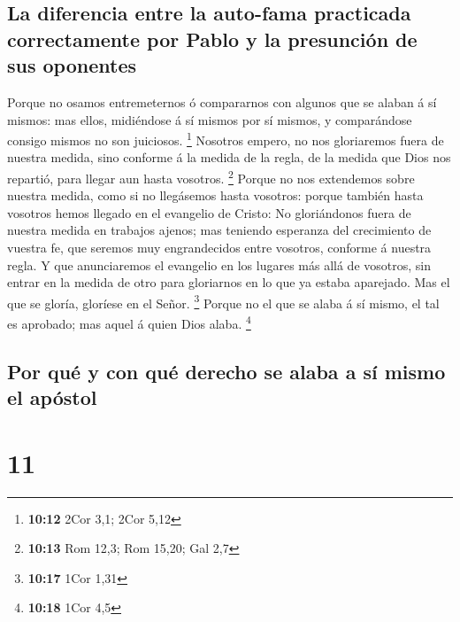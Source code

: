 \hypertarget{la-diferencia-entre-la-auto-fama-practicada-correctamente-por-pablo-y-la-presunciuxf3n-de-sus-oponentes}{%
\subsection{La diferencia entre la auto-fama practicada correctamente
por Pablo y la presunción de sus
oponentes}\label{la-diferencia-entre-la-auto-fama-practicada-correctamente-por-pablo-y-la-presunciuxf3n-de-sus-oponentes}}

 Porque no osamos entremeternos ó compararnos con algunos
que se alaban á sí mismos: mas ellos, midiéndose á sí mismos por sí
mismos, y comparándose consigo mismos no son juiciosos. \footnote{\textbf{10:12}
  2Cor 3,1; 2Cor 5,12}  Nosotros empero, no nos gloriaremos
fuera de nuestra medida, sino conforme á la medida de la regla, de la
medida que Dios nos repartió, para llegar aun hasta vosotros.
\footnote{\textbf{10:13} Rom 12,3; Rom 15,20; Gal 2,7} 
Porque no nos extendemos sobre nuestra medida, como si no llegásemos
hasta vosotros: porque también hasta vosotros hemos llegado en el
evangelio de Cristo:  No gloriándonos fuera de nuestra
medida en trabajos ajenos; mas teniendo esperanza del crecimiento de
vuestra fe, que seremos muy engrandecidos entre vosotros, conforme á
nuestra regla.  Y que anunciaremos el evangelio en los
lugares más allá de vosotros, sin entrar en la medida de otro para
gloriarnos en lo que ya estaba aparejado.  Mas el que se
gloría, gloríese en el Señor. \footnote{\textbf{10:17} 1Cor 1,31}
 Porque no el que se alaba á sí mismo, el tal es aprobado;
mas aquel á quien Dios alaba. \footnote{\textbf{10:18} 1Cor 4,5}

\hypertarget{por-quuxe9-y-con-quuxe9-derecho-se-alaba-a-suxed-mismo-el-apuxf3stol}{%
\subsection{Por qué y con qué derecho se alaba a sí mismo el
apóstol}\label{por-quuxe9-y-con-quuxe9-derecho-se-alaba-a-suxed-mismo-el-apuxf3stol}}

\hypertarget{section-10}{%
\section{11}\label{section-10}}

